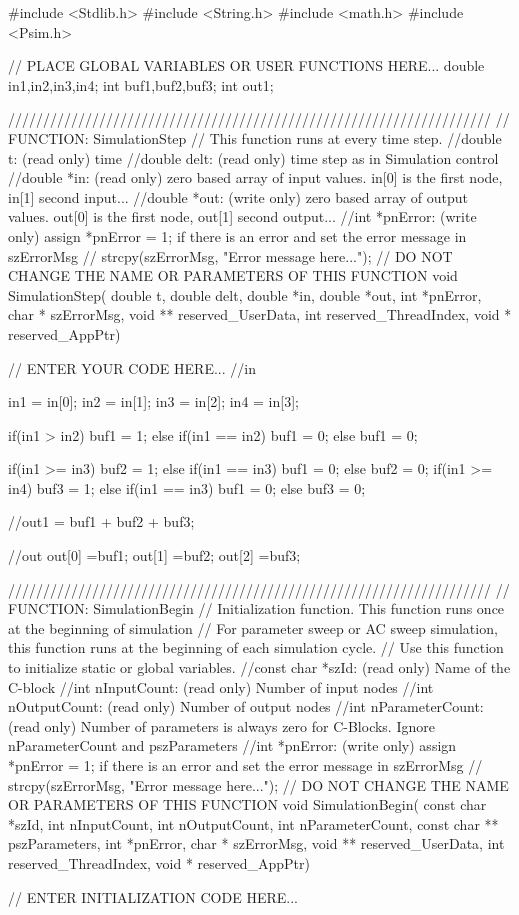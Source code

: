 \begin{mylisting}[language=c,caption=4番レグ用比較モジュール,label=hurokuB_hikakuD]

#include <Stdlib.h>
#include <String.h>
#include <math.h>
#include <Psim.h>

// PLACE GLOBAL VARIABLES OR USER FUNCTIONS HERE...
double in1,in2,in3,in4;
int buf1,buf2,buf3;
int out1;

/////////////////////////////////////////////////////////////////////
// FUNCTION: SimulationStep
//   This function runs at every time step.
//double t: (read only) time
//double delt: (read only) time step as in Simulation control
//double *in: (read only) zero based array of input values. in[0] is the first node, in[1] second input...
//double *out: (write only) zero based array of output values. out[0] is the first node, out[1] second output...
//int *pnError: (write only)  assign  *pnError = 1;  if there is an error and set the error message in szErrorMsg
//    strcpy(szErrorMsg, "Error message here..."); 
// DO NOT CHANGE THE NAME OR PARAMETERS OF THIS FUNCTION
void SimulationStep(
		double t, double delt, double *in, double *out,
		 int *pnError, char * szErrorMsg,
		 void ** reserved_UserData, int reserved_ThreadIndex, void * reserved_AppPtr)
{
// ENTER YOUR CODE HERE...
//in

in1 = in[0];
in2 = in[1];
in3 = in[2];
in4 = in[3];

	if(in1 > in2){
	buf1 = 1;
	}else if(in1 == in2){
	buf1 = 0;
	}else{
	buf1 = 0;
	}

	if(in1 >= in3){
	buf2 = 1;
	}else if(in1 == in3){
	buf1 = 0;
	}else{
	buf2 = 0;
	}
	if(in1 >= in4){
	buf3 = 1;
	}else if(in1 == in3){
	buf1 = 0;
	}else{
	buf3 = 0;
	}
	
	//out1 = buf1 + buf2 + buf3;

//out
out[0] =buf1;
out[1] =buf2;
out[2] =buf3;
}


/////////////////////////////////////////////////////////////////////
// FUNCTION: SimulationBegin
//   Initialization function. This function runs once at the beginning of simulation
//   For parameter sweep or AC sweep simulation, this function runs at the beginning of each simulation cycle.
//   Use this function to initialize static or global variables.
//const char *szId: (read only) Name of the C-block 
//int nInputCount: (read only) Number of input nodes
//int nOutputCount: (read only) Number of output nodes
//int nParameterCount: (read only) Number of parameters is always zero for C-Blocks.  Ignore nParameterCount and pszParameters
//int *pnError: (write only)  assign  *pnError = 1;  if there is an error and set the error message in szErrorMsg
//    strcpy(szErrorMsg, "Error message here..."); 
// DO NOT CHANGE THE NAME OR PARAMETERS OF THIS FUNCTION
void SimulationBegin(
		const char *szId, int nInputCount, int nOutputCount,
		 int nParameterCount, const char ** pszParameters,
		 int *pnError, char * szErrorMsg,
		 void ** reserved_UserData, int reserved_ThreadIndex, void * reserved_AppPtr)
{
// ENTER INITIALIZATION CODE HERE...




}
\end{mylisting}
